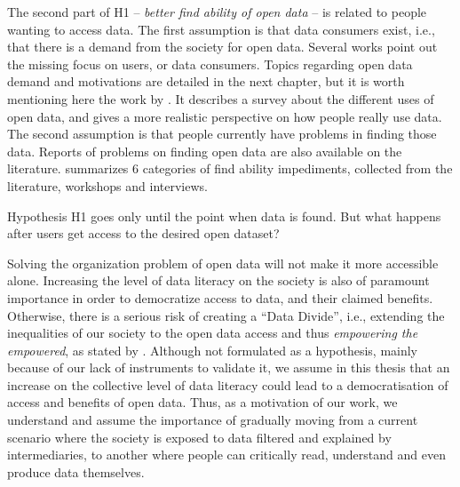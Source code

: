 {The second part of H1 -- \emph{better find ability of open data} -- is related to people wanting to access data.
The first assumption is that data consumers exist, i.e., that there is a demand from the society for open data.
Several works point out the missing focus on users, or data consumers.
Topics regarding open data demand and motivations are detailed in the next chapter, but it is worth mentioning here the work by . 
It describes a survey about the different uses of open data, and gives a more realistic perspective on how people really use data.
The second assumption is that people currently have problems in finding those data.
Reports of problems on finding open data are also available on the literature.
 summarizes 6 categories of find ability impediments, collected from the literature, workshops and interviews.

Hypothesis H1 goes only until the point when data is found.
But what happens after users get access to the desired open dataset?

Solving the organization problem of open data will not make it more accessible alone.
Increasing the level of data literacy on the society is also of paramount importance in order to democratize access to data, and their claimed benefits.
Otherwise, there is a serious risk of creating a ``Data Divide'', i.e., extending the inequalities of our society to the open data access and thus \emph{empowering the empowered}, as stated by .
Although not formulated as a hypothesis, mainly because of our lack of instruments to validate it, we assume in this thesis that an increase on the collective level of data literacy could lead to a democratisation of access and benefits of open data.
Thus, as a motivation of our work, we understand and assume the importance of gradually moving from a current scenario where the society is exposed to data filtered and explained by intermediaries, to another where people can critically read, understand and even produce data themselves.

}
